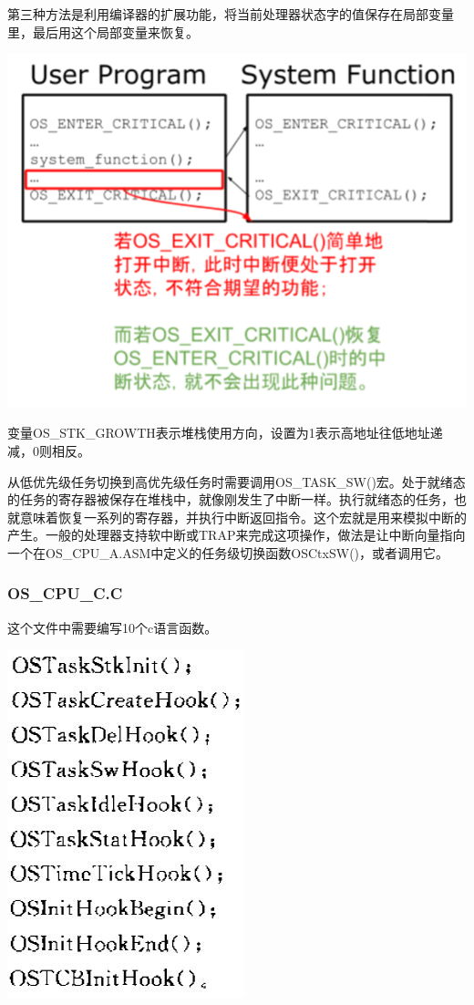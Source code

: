 \documentclass{ctexart}
\begin{document}
        第三种方法是利用编译器的扩展功能，将当前处理器状态字的值保存在局部变量里，最后用这个局部变量来恢复。
        
\centerline{\includegraphics[scale=0.65]{interrupt}}\par
         
        变量OS\_STK\_GROWTH表示堆栈使用方向，设置为1表示高地址往低地址递减，0则相反。
               
        从低优先级任务切换到高优先级任务时需要调用OS\_TASK\_SW()宏。处于就绪态的任务的寄存器被保存在堆栈中，就像刚发生了中断一样。执行就绪态的任务，也就意味着恢复一系列的寄存器，并执行中断返回指令。这个宏就是用来模拟中断的产生。一般的处理器支持软中断或TRAP来完成这项操作，做法是让中断向量指向一个在OS\_CPU\_A.ASM中定义的任务级切换函数OSCtxSW()，或者调用它。
\subsubsection{OS\_CPU\_C.C}
这个文件中需要编写10个c语言函数。

\centerline{\includegraphics[scale=0.65]{003}}\par
\end{document}
